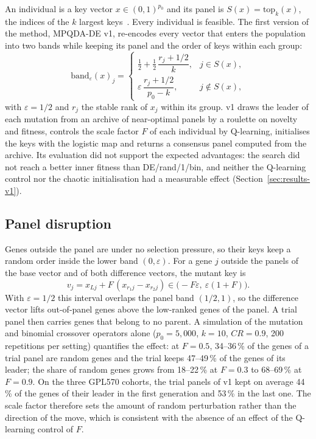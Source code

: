 An individual is a key vector $x\in(0,1)^{p_0}$ and its panel is $S(x)=\mathrm{top}_k(x)$, the indices of the $k$ largest
keys~\cite{bean1994}. Every individual is feasible. The first version of the method, MPQDA-DE v1, re-encodes every vector
that enters the population into two bands while keeping its panel and the order of keys within each group:
\begin{equation}\label{eq:band}
  \mathrm{band}_\varepsilon(x)_j=
  \begin{cases}
    \tfrac12+\tfrac12\,\dfrac{r_j+1/2}{k}, & j\in S(x),\\[4pt]
    \varepsilon\,\dfrac{r_j+1/2}{p_0-k}, & j\notin S(x),
  \end{cases}
\end{equation}
with $\varepsilon=1/2$ and $r_j$ the stable rank of $x_j$ within its group. v1 draws the leader of each mutation from an archive
of near-optimal panels by a roulette on novelty and fitness, controls the scale factor $F$ of each individual by Q-learning,
initialises the keys with the logistic map and returns a consensus panel computed from the archive. Its evaluation did not
support the expected advantages: the search did not reach a better inner fitness than DE/rand/1/bin, and neither the
Q-learning control nor the chaotic initialisation had a measurable effect (Section~\ref{sec:results-v1}).

\subsection{Panel disruption}\label{sec:disruption}

Genes outside the panel are under no selection pressure, so their keys keep a random order inside the lower band
$(0,\varepsilon)$. For a gene $j$ outside the panels of the base vector and of both difference vectors, the mutant key is
\begin{equation}\label{eq:mutant}
  v_j = x_{Lj} + F\,(x_{r_1 j}-x_{r_2 j}) \in \big(-F\varepsilon,\ \varepsilon(1+F)\big).
\end{equation}
With $\varepsilon=1/2$ this interval overlaps the panel band $(1/2,1)$, so the difference vector lifts out-of-panel genes above
the low-ranked genes of the panel. A trial panel then carries genes that belong to no parent. A simulation of the mutation and
binomial crossover operators alone ($p_0=5{,}000$, $k=10$, $CR=0.9$, 200 repetitions per setting) quantifies the effect: at
$F=0.5$, 34--36\,\% of the genes of a trial panel are random genes and the trial keeps 47--49\,\% of the genes of its leader;
the share of random genes grows from 18--22\,\% at $F=0.3$ to 68--69\,\% at $F=0.9$.
On the three GPL570 cohorts, the trial panels of v1 kept on average 44\,\% of the genes of their leader in the first
generation and 53\,\% in the last one.
The scale factor therefore sets the amount of random perturbation rather than the direction of the move, which is consistent
with the absence of an effect of the Q-learning control of $F$.

